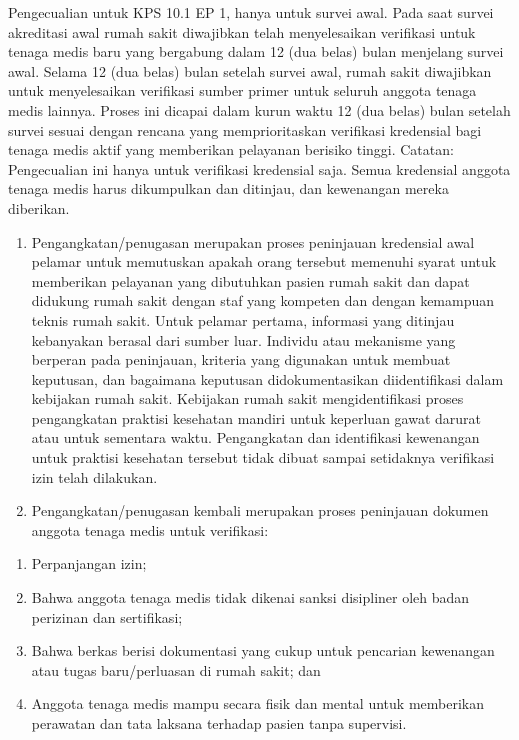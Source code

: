 \documentclass[
]{book}
\providecommand{\tightlist}{%
  \setlength{\itemsep}{0pt}\setlength{\parskip}{0pt}}
\begin{document}
Pengecualian untuk KPS 10.1 EP 1, hanya untuk survei awal. Pada saat survei akreditasi awal rumah sakit diwajibkan telah menyelesaikan verifikasi untuk tenaga medis baru yang bergabung dalam 12 (dua belas) bulan menjelang survei awal. Selama 12 (dua belas) bulan setelah survei awal, rumah sakit diwajibkan untuk menyelesaikan verifikasi sumber primer untuk seluruh anggota tenaga medis lainnya. Proses ini dicapai dalam kurun waktu 12 (dua belas) bulan setelah survei sesuai dengan rencana yang memprioritaskan verifikasi kredensial bagi tenaga medis aktif yang memberikan pelayanan berisiko tinggi.
Catatan: Pengecualian ini hanya untuk verifikasi kredensial saja. Semua kredensial anggota tenaga medis harus dikumpulkan dan ditinjau, dan kewenangan mereka diberikan.

\begin{enumerate}
\def\labelenumi{\alph{enumi}.}
\setcounter{enumi}{4}
\tightlist
\item
  Pengangkatan/penugasan merupakan proses peninjauan kredensial awal pelamar untuk memutuskan apakah orang tersebut memenuhi syarat untuk memberikan pelayanan yang dibutuhkan pasien rumah sakit dan dapat didukung rumah sakit dengan staf yang kompeten dan dengan kemampuan teknis rumah sakit. Untuk pelamar pertama, informasi yang ditinjau kebanyakan berasal dari sumber luar. Individu atau mekanisme yang berperan pada peninjauan, kriteria yang digunakan untuk membuat keputusan, dan bagaimana keputusan didokumentasikan diidentifikasi dalam kebijakan rumah sakit. Kebijakan rumah sakit mengidentifikasi proses pengangkatan praktisi kesehatan mandiri untuk keperluan gawat darurat atau untuk sementara waktu. Pengangkatan dan identifikasi kewenangan untuk praktisi kesehatan tersebut tidak dibuat sampai setidaknya verifikasi izin telah dilakukan.
\item
  Pengangkatan/penugasan kembali merupakan proses peninjauan dokumen anggota tenaga medis untuk verifikasi:
\end{enumerate}

\begin{enumerate}
\def\labelenumi{\arabic{enumi}.}
\tightlist
\item
  Perpanjangan izin;
\item
  Bahwa anggota tenaga medis tidak dikenai sanksi disipliner oleh badan perizinan dan sertifikasi;
\item
  Bahwa berkas berisi dokumentasi yang cukup untuk pencarian kewenangan atau tugas baru/perluasan di rumah sakit; dan
\item
  Anggota tenaga medis mampu secara fisik dan mental untuk memberikan perawatan dan tata laksana terhadap pasien tanpa supervisi.
\end{enumerate}
\end{document}
